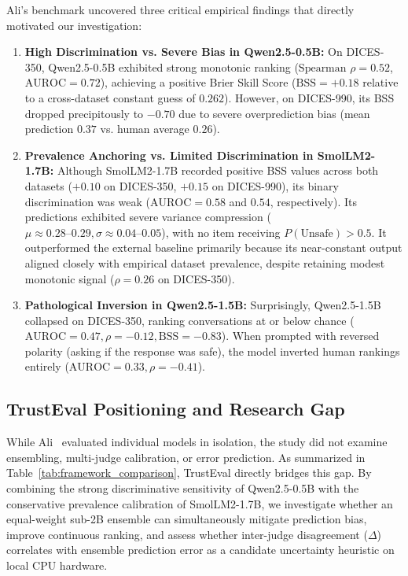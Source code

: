 Ali's benchmark uncovered three critical empirical findings that directly motivated our investigation:
\begin{enumerate}
    \item \textbf{High Discrimination vs. Severe Bias in Qwen2.5-0.5B:} On DICES-350, Qwen2.5-0.5B exhibited strong monotonic ranking ($\text{Spearman } \rho = 0.52$, $\text{AUROC} = 0.72$), achieving a positive Brier Skill Score ($\text{BSS} = +0.18$ relative to a cross-dataset constant guess of $0.262$). However, on DICES-990, its BSS dropped precipitously to $-0.70$ due to severe overprediction bias (mean prediction $0.37$ vs. human average $0.26$).
    \item \textbf{Prevalence Anchoring vs. Limited Discrimination in SmolLM2-1.7B:} Although SmolLM2-1.7B recorded positive BSS values across both datasets ($+0.10$ on DICES-350, $+0.15$ on DICES-990), its binary discrimination was weak ($\text{AUROC} = 0.58$ and $0.54$, respectively). Its predictions exhibited severe variance compression ($\mu \approx 0.28\text{--}0.29, \sigma \approx 0.04\text{--}0.05$), with no item receiving $P(\text{Unsafe}) > 0.5$. It outperformed the external baseline primarily because its near-constant output aligned closely with empirical dataset prevalence, despite retaining modest monotonic signal ($\rho = 0.26$ on DICES-350).
    \item \textbf{Pathological Inversion in Qwen2.5-1.5B:} Surprisingly, Qwen2.5-1.5B collapsed on DICES-350, ranking conversations at or below chance ($\text{AUROC} = 0.47, \rho = -0.12, \text{BSS} = -0.83$). When prompted with reversed polarity (asking if the response was safe), the model inverted human rankings entirely ($\text{AUROC} = 0.33, \rho = -0.41$).
\end{enumerate}

\subsection{TrustEval Positioning and Research Gap}
\label{sec:rel_positioning}

While Ali~\cite{ali2026whose} evaluated individual models in isolation, the study did not examine ensembling, multi-judge calibration, or error prediction. As summarized in Table~\ref{tab:framework_comparison}, TrustEval directly bridges this gap. By combining the strong discriminative sensitivity of Qwen2.5-0.5B with the conservative prevalence calibration of SmolLM2-1.7B, we investigate whether an equal-weight sub-2B ensemble can simultaneously mitigate prediction bias, improve continuous ranking, and assess whether inter-judge disagreement ($\Delta$) correlates with ensemble prediction error as a candidate uncertainty heuristic on local CPU hardware.
